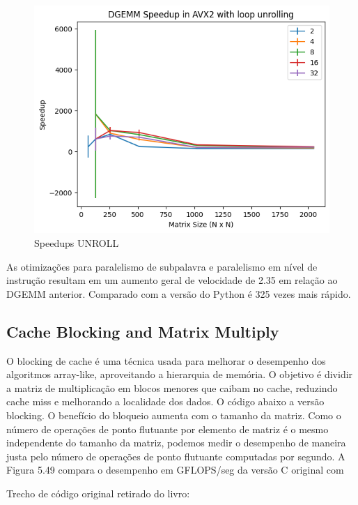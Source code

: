 \documentclass[12pt]{article}
\begin{document}
\begin{figure}[h]
    \centering
    \includegraphics[scale=0.6]{figures/speedups_unroll.png}
    \caption{Speedups UNROLL}
    \label{fig:speedups-unroll}
\end{figure}

As otimizações para paralelismo de subpalavra e paralelismo em nível de instrução resultam em um aumento geral de velocidade de 2.35 em relação ao DGEMM anterior. Comparado com a versão do Python é 325 vezes mais rápido.

\newpage
\newpage

\subsection{Cache Blocking and Matrix Multiply}

O blocking de cache é uma técnica usada para melhorar o desempenho dos algoritmos array-like, aproveitando a hierarquia de memória. O objetivo é dividir a matriz de multiplicação em blocos menores que caibam no cache, reduzindo cache miss e melhorando a localidade dos dados. O código abaixo a versão blocking. O benefício do bloqueio aumenta com o tamanho da matriz. Como o número de operações de ponto flutuante por elemento de matriz é o mesmo independente do tamanho da matriz, podemos medir o desempenho de maneira justa pelo número de operações de ponto flutuante computadas por segundo. A Figura 5.49 compara o desempenho em GFLOPS/seg da versão C original com

Trecho de código original retirado do livro:
\end{document}
